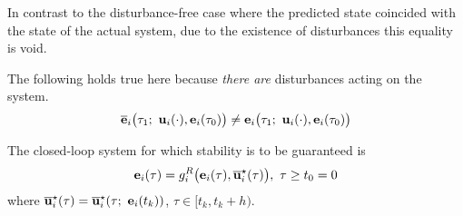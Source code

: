 In contrast to the disturbance-free case where the predicted state coincided
with the state of the actual system, due to the existence of disturbances
this equality is void.

\begin{bw_box}
\begin{remark}
  The following holds true here because \textit{there are} disturbances
  acting on the system.
  \begin{align}
    \overline{\bm{\mathbf{e}}}_i\big(\tau_1;\ \bm{\mathbf{u}}_i(\cdot), \bm{\mathbf{e}}_i(\tau_0)\big) \not=
    \bm{\mathbf{e}}_i\big(\tau_1;\ \bm{\mathbf{u}}_i(\cdot), \bm{\mathbf{e}}_i(\tau_0)\big)
    \label{eq:error_now_to_predicted_error_2}
  \end{align}
\end{remark}
\end{bw_box}

The closed-loop system for which stability is to be guaranteed is
\begin{align}
  \bm{\mathbf{e}}_i(\tau) = g_i^R\big(\bm{\mathbf{e}}_i(\tau), \overline{\bm{\mathbf{u}}}_i^{\star}(\tau)\big),\ \tau \geq t_0 = 0
  \label{eq:with_disturbances_closed_loop}
\end{align}
where $\overline{\bm{\mathbf{u}}}_i^{\star}(\tau) = \overline{\bm{\mathbf{u}}}_i^{\star}(\tau;\ \bm{\mathbf{e}}_i(t_k))$,
$\tau \in [t_k, t_k + h)$.

